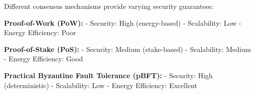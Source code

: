 Different consensus mechanisms provide varying security guarantees:

\textbf{Proof-of-Work (PoW):}
- Security: High (energy-based)
- Scalability: Low
- Energy Efficiency: Poor

\textbf{Proof-of-Stake (PoS):}
- Security: Medium (stake-based)
- Scalability: Medium
- Energy Efficiency: Good

\textbf{Practical Byzantine Fault Tolerance (pBFT):}
- Security: High (deterministic)
- Scalability: Low
- Energy Efficiency: Excellent